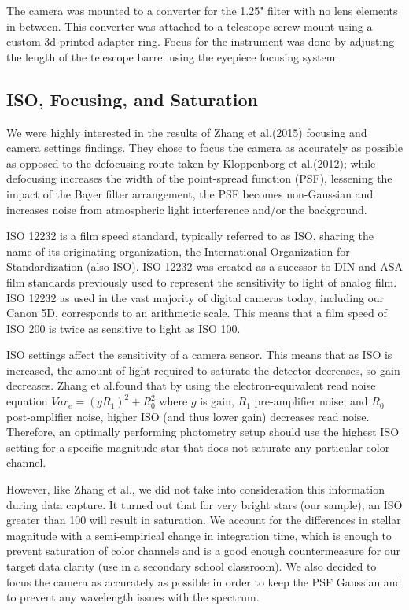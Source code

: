 \documentclass[prb,preprint]{revtex4-1}
\begin{document}
	The camera was mounted to a converter for the 1.25" filter with no lens elements in between. This converter was attached to a telescope screw-mount using a custom 3d-printed adapter ring. Focus for the instrument was done by adjusting the length of the telescope barrel using the eyepiece focusing system.
	
	\subsection{ISO, Focusing, and Saturation}

	We were highly interested in the results of Zhang et al.\@(2015)\cite{mbpdslr} focusing and camera settings findings. They chose to focus the camera as accurately as possible as opposed to the defocusing route taken by Kloppenborg et al.\@(2012);\cite{vbpdslr} while defocusing increases the width of the point-spread function (PSF), lessening the impact of the Bayer filter arrangement, the PSF becomes non-Gaussian and increases noise from atmospheric light interference and/or the background.
	
	ISO 12232 is a film speed standard\cite{12232}, typically referred to as ISO, sharing the name of its originating organization, the International Organization for Standardization (also ISO). ISO 12232 was created as a sucessor to DIN and ASA film standards previously used to represent the sensitivity to light of analog film. ISO 12232 as used in the vast majority of digital cameras today, including our Canon 5D, corresponds to an arithmetic scale. This means that a film speed of ISO 200 is twice as sensitive to light as ISO 100.
	
	ISO settings affect the sensitivity of a camera sensor. This means that as ISO is increased, the amount of light required to saturate the detector decreases, so gain decreases. Zhang et al.\cite{mbpdslr}\@ found that by using the electron-equivalent read noise equation $V ar_e = (gR_1)^2 + R^2_0$ where $g$ is gain, $R_1$ pre-amplifier noise, and $R_0$ post-amplifier noise, higher ISO (and thus lower gain) decreases read noise. Therefore, an optimally performing photometry setup should use the highest ISO setting for a specific magnitude star that does not saturate any particular color channel.
	
	However, like Zhang et al.,\cite{mbpdslr} we did not take into consideration this information during data capture. It turned out that for very bright stars (our sample), an ISO greater than 100 will result in saturation. We account for the differences in stellar magnitude with a semi-empirical change in integration time, which is enough to prevent saturation of color channels and is a good enough countermeasure for our target data clarity (use in a secondary school classroom). We also decided to focus the camera as accurately as possible in order to keep the PSF Gaussian and to prevent any wavelength issues with the spectrum.
	
\end{document}
